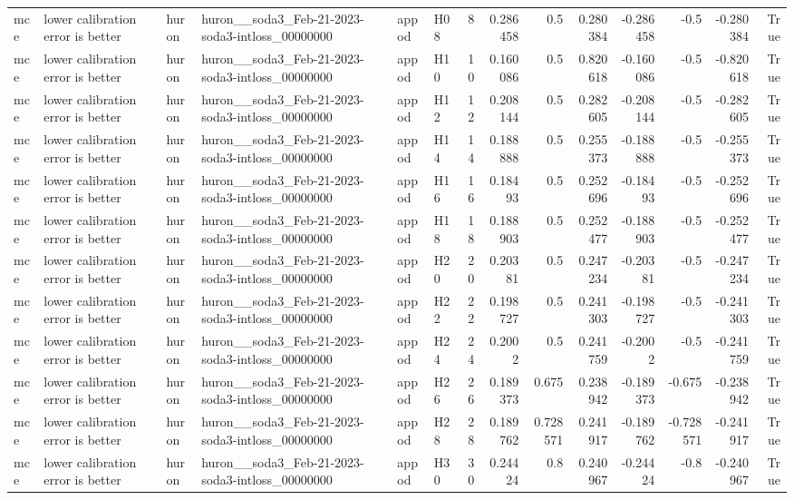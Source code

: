 \begin{longtable}{llllllrrrrrrrr}
mce & lower calibration error is better & huron & huron\_\_soda3\_Feb-21-2023-soda3-intloss\_00000000 & appod & H08 & 8 & 0.286458 & 0.5 & 0.280384 & -0.286458 & -0.5 & -0.280384 & True \\
mce & lower calibration error is better & huron & huron\_\_soda3\_Feb-21-2023-soda3-intloss\_00000000 & appod & H10 & 10 & 0.160086 & 0.5 & 0.820618 & -0.160086 & -0.5 & -0.820618 & True \\
mce & lower calibration error is better & huron & huron\_\_soda3\_Feb-21-2023-soda3-intloss\_00000000 & appod & H12 & 12 & 0.208144 & 0.5 & 0.282605 & -0.208144 & -0.5 & -0.282605 & True \\
mce & lower calibration error is better & huron & huron\_\_soda3\_Feb-21-2023-soda3-intloss\_00000000 & appod & H14 & 14 & 0.188888 & 0.5 & 0.255373 & -0.188888 & -0.5 & -0.255373 & True \\
mce & lower calibration error is better & huron & huron\_\_soda3\_Feb-21-2023-soda3-intloss\_00000000 & appod & H16 & 16 & 0.18493 & 0.5 & 0.252696 & -0.18493 & -0.5 & -0.252696 & True \\
mce & lower calibration error is better & huron & huron\_\_soda3\_Feb-21-2023-soda3-intloss\_00000000 & appod & H18 & 18 & 0.188903 & 0.5 & 0.252477 & -0.188903 & -0.5 & -0.252477 & True \\
mce & lower calibration error is better & huron & huron\_\_soda3\_Feb-21-2023-soda3-intloss\_00000000 & appod & H20 & 20 & 0.20381 & 0.5 & 0.247234 & -0.20381 & -0.5 & -0.247234 & True \\
mce & lower calibration error is better & huron & huron\_\_soda3\_Feb-21-2023-soda3-intloss\_00000000 & appod & H22 & 22 & 0.198727 & 0.5 & 0.241303 & -0.198727 & -0.5 & -0.241303 & True \\
mce & lower calibration error is better & huron & huron\_\_soda3\_Feb-21-2023-soda3-intloss\_00000000 & appod & H24 & 24 & 0.2002 & 0.5 & 0.241759 & -0.2002 & -0.5 & -0.241759 & True \\
mce & lower calibration error is better & huron & huron\_\_soda3\_Feb-21-2023-soda3-intloss\_00000000 & appod & H26 & 26 & 0.189373 & 0.675 & 0.238942 & -0.189373 & -0.675 & -0.238942 & True \\
mce & lower calibration error is better & huron & huron\_\_soda3\_Feb-21-2023-soda3-intloss\_00000000 & appod & H28 & 28 & 0.189762 & 0.728571 & 0.241917 & -0.189762 & -0.728571 & -0.241917 & True \\
mce & lower calibration error is better & huron & huron\_\_soda3\_Feb-21-2023-soda3-intloss\_00000000 & appod & H30 & 30 & 0.24424 & 0.8 & 0.240967 & -0.24424 & -0.8 & -0.240967 & True \\

\end{longtable}
